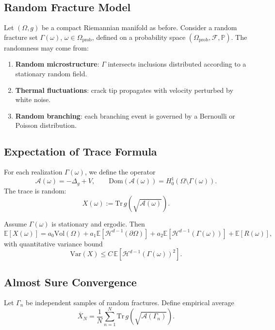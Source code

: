 \subsection{Random Fracture Model}

Let $(\Omega, g)$ be a compact Riemannian manifold as before.  
Consider a random fracture set $\Gamma(\omega)$, $\omega \in \Omega_{\text{prob}}$, defined on a probability space $(\Omega_{\text{prob}}, \mathcal{F}, \mathbb{P})$.  
The randomness may come from:

\begin{enumerate}[label=(\alph*)]
  \item \textbf{Random microstructure}: $\Gamma$ intersects inclusions distributed according to a stationary random field.  
  \item \textbf{Thermal fluctuations}: crack tip propagates with velocity perturbed by white noise.  
  \item \textbf{Random branching}: each branching event is governed by a Bernoulli or Poisson distribution.  
\end{enumerate}

\subsection{Expectation of Trace Formula}

For each realization $\Gamma(\omega)$, we define the operator
\[
\mathcal{A}(\omega) = -\Delta_g + V, \qquad \text{Dom}(\mathcal{A}(\omega)) = H^1_0(\Omega \setminus \Gamma(\omega)).
\]
The trace is random:
\[
X(\omega) := \mathrm{Tr}\, g(\sqrt{\mathcal{A}(\omega)}).
\]

\begin{theorem}
\label{thm:expected-trace}
Assume $\Gamma(\omega)$ is stationary and ergodic.  
Then
\[
\mathbb{E}[X(\omega)] =
a_0 \mathrm{Vol}(\Omega) +
a_1 \mathbb{E}[\mathcal{H}^{d-1}(\partial \Omega)] +
a_2 \mathbb{E}[\mathcal{H}^{d-1}(\Gamma(\omega))] + \mathbb{E}[R(\omega)],
\]
with quantitative variance bound
\[
\mathrm{Var}(X) \leq C \,\mathbb{E}[\mathcal{H}^{d-1}(\Gamma(\omega))^2].
\]
\end{theorem}

\subsection{Almost Sure Convergence}

Let $\Gamma_n$ be independent samples of random fractures.  
Define empirical average
\[
\overline{X}_N = \frac{1}{N}\sum_{n=1}^N \mathrm{Tr}\, g(\sqrt{\mathcal{A}(\Gamma_n)}).
\]


